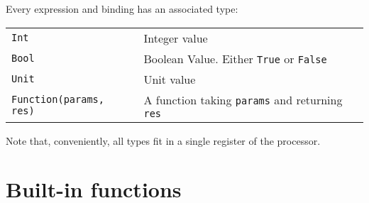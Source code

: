 \documentclass[a4paper, 11pt]{article}
\begin{document}
Every expression and binding has an associated type:\\[1.5ex]
\begin{tabularx}{\linewidth}{lX}
  \texttt{Int} & Integer value\\
  \texttt{Bool} & Boolean Value. Either \texttt{True} or
  \texttt{False}\\
  \texttt{Unit} & Unit value\\
  \texttt{Function(params, res)} & A function taking \texttt{params}
  and returning \texttt{res}\\
\end{tabularx}

Note that, conveniently, all types fit in a single register of the
processor.

\section{Built-in functions}
\end{document}
